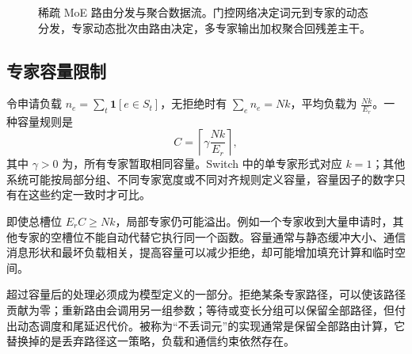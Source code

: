\documentclass[../textbook.tex]{subfiles}
\begin{document}
\begin{figure}[htbp]
\centering
{}
\caption[稀疏 MoE 路由分发与聚合数据流]{稀疏 MoE 路由分发与聚合数据流。门控网络决定词元到专家的动态分发，专家动态批次由路由决定，多专家输出加权聚合回残差主干。}\label{fig:moe-dispatch}
\end{figure}

\subsection{专家容量限制}
令申请负载 $n_e=\sum_t\mathbf1[e\in S_t]$，无拒绝时有 $\sum_en_e=Nk$，平均负载为 $\frac{Nk}{E_r}$。一种容量规则是
\begin{equation}
 C=\left\lceil\gamma\frac{Nk}{E_r}\right\rceil,
 \label{eq:moe-capacity}
\end{equation}
其中 $\gamma>0$ 为，所有专家暂取相同容量。Switch 中的单专家形式对应 $k=1$\cite{fedus2022switch}；其他系统可能按局部分组、不同专家宽度或不同对齐规则定义容量，容量因子的数字只有在这些约定一致时才可比。

即使总槽位 $E_rC\ge Nk$，局部专家仍可能溢出。例如一个专家收到大量申请时，其他专家的空槽位不能自动代替它执行同一个函数。容量通常与静态缓冲大小、通信消息形状和最坏负载相关，提高容量可以减少拒绝，却可能增加填充计算和临时空间。

超过容量后的处理必须成为模型定义的一部分。拒绝某条专家路径，可以使该路径贡献为零；重新路由会调用另一组参数；等待或变长分组可以保留全部路径，但付出动态调度和尾延迟代价。被称为“不丢词元”的实现通常是保留全部路由计算，它替换掉的是丢弃路径这一策略，负载和通信约束依然存在。
\end{document}
